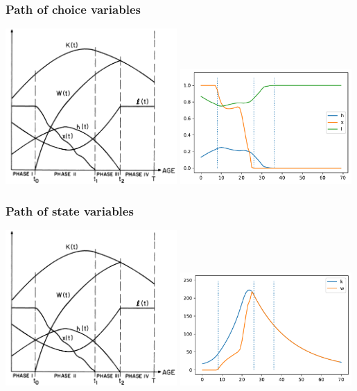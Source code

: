 \documentclass[aspectratio=169]{beamer}
\begin{document}
\begin{frame}
    \frametitle{Path of choice variables}
    
        \includegraphics[width=0.49\textwidth]{../output/phases.png}
        \includegraphics[width=0.49\textwidth]{../output/fd_hjb_choice_path.pdf}

\end{frame}

\begin{frame}
    \frametitle{Path of state variables}
    
        \includegraphics[width=0.49\textwidth]{../output/phases.png}
        \includegraphics[width=0.49\textwidth]{../output/fd_hjb_state_path.pdf}

\end{frame}
\end{document}
